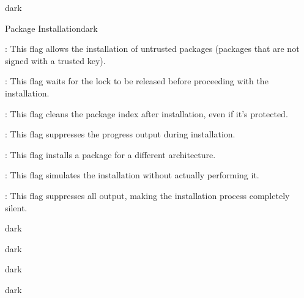 \begin{baseBoxThree}{}{dark}
\begin{baseBoxThree}{Package Installation}{dark}
\begin{posnexItemize}
            \item[\sA] : This flag allows the installation of untrusted packages (packages that are not signed with a trusted key).
            \item[\sA] : This flag waits for the lock to be released before proceeding with the installation.
            \item[\sA] : This flag cleans the package index after installation, even if it's protected.
            \item[\sA] : This flag suppresses the progress output during installation.
            \item[\sA] : This flag installs a package for a different architecture.
            \item[\sA] : This flag simulates the installation without actually performing it.
            \item[\sA] : This flag suppresses all output, making the installation process completely silent.
        \end{posnexItemize}
        \smallskip
    \end{baseBoxThree}
    \smallskip
\end{baseBoxThree}

\begin{baseBoxThree}{}{dark}
    \begin{baseBoxThree}{}{dark}
        \begin{posnex}
        \end{posnex}
        
        \smallskip
    \end{baseBoxThree}
    \smallskip
\end{baseBoxThree}

\begin{baseBoxThree}{}{dark}
    \smallskip
    \begin{baseBoxThree}{}{dark}
        \begin{posnex}
        \end{posnex}
    \end{baseBoxThree}
    \smallskip
\end{baseBoxThree}


